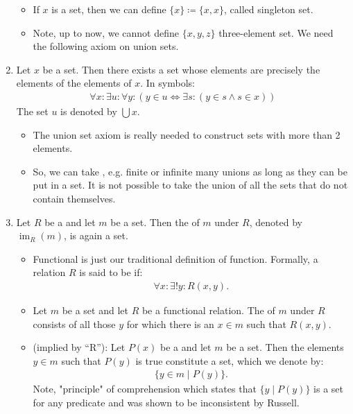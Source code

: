\documentclass{article}
\begin{document}
\begin{enumerate}
\begin{itemize}
\item  If $x$ is a set, then we can define $\{x\}\coloneqq\{x, x\}$,  called singleton set. 
\item Note, up to now, we cannot define $\{x,y,z\}$ three-element set. We need the following axiom on union sets.
\end{itemize}
\item {} Let $x$ be a set. Then there exists a set whose elements are precisely the elements of the elements of $x$. In symbols:
\begin{align*}
\forall x: \exists u: \forall y:(y \in u \Leftrightarrow \exists s:(y \in s \wedge s \in x))
\end{align*}
The set $u$ is denoted by $\bigcup x$.
\begin{itemize}
    \item The union set axiom is really needed to construct sets with more than 2 elements.
    \item So, we can take , e.g. finite or infinite many unions as long as they can be put in a set. It is not possible to take the union of all the sets that do not contain themselves.
\end{itemize}
\item {} Let $R$ be a  and let $m$ be a set. Then the  of $m$ under $R$, denoted by $\operatorname{im}_{R}(m)$, is again a set.
\begin{itemize}
    \item Functional is just our traditional definition of function. Formally, a relation $R$ is said to be  if:
\begin{align*}
\forall x: \exists ! y: R(x, y) .
\end{align*}
\item Let $m$ be a set and let $R$ be a functional relation. The  of $m$ under $R$ consists of all those $y$ for which there is an $x \in m$ such that $R(x, y)$.
\item {} (implied by ``R''): Let $P(x)$ be a  and let $m$ be a set. Then the elements $y \in m$ such that $P(y)$ is true constitute a set, which we denote by:
\begin{align*}
\{y \in m \mid P(y)\} .
\end{align*}
Note, "principle" of  comprehension which states that $\{y \mid P(y)\}$ is a set for any predicate and was shown to be inconsistent by Russell. 

\end{itemize}
\end{enumerate}
\end{document}
